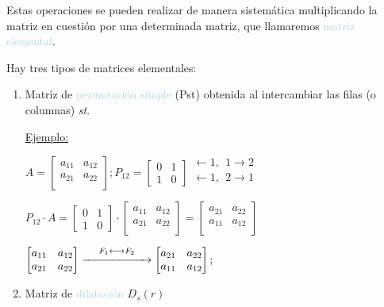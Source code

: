 \documentclass[12pt]{article}
\begin{document}
Estas operaciones se pueden realizar de manera sistemática
multiplicando la matriz en cuestión por una determinada matriz,
que llamaremos \textcolor{lightblue}{matriz elemental}.

Hay tres tipos de matrices elementales:

\begin{enumerate}
\item Matriz de \textcolor{lightblue}{permutación simple} (Pst)
obtenida al intercambiar las filas (o columnas) \emph{st}.
    
    \underline{Ejemplo:}

    $A=\begin{bmatrix}
        a_{11} & a_{12}\\
        a_{21} & a_{22}\\
    \end{bmatrix}; P_{12}=\begin{bmatrix}
        0 & 1\\ 
        1 & 0
    \end{bmatrix}\begin{array}{l}
        \longleftarrow 1,~~1\longrightarrow 2\\
        \longleftarrow 1,~~2\longrightarrow 1\\
    \end{array}$

    $P_{12}\cdot A=\begin{bmatrix}
        0 & 1\\
        1 & 0
    \end{bmatrix}\cdot    \begin{bmatrix}
        a_{11} & a_{12}\\
        a_{21} & a_{22}\\
    \end{bmatrix}=    \begin{bmatrix}
        a_{21} & a_{22}\\
        a_{11} & a_{12}\\
    \end{bmatrix}$

    $    \begin{bmatrix}
        a_{11} & a_{12}\\
        a_{21} & a_{22}\\
\end{bmatrix}\overset{F_1\longleftrightarrow
F_2}{\xrightarrow{\hspace*{2cm}}} \begin{bmatrix}
        a_{21} & a_{22}\\
        a_{11} & a_{12}\\
    \end{bmatrix};$
    \item Matriz de \textcolor{lightblue}{dilatación} $D_s(r)$
    

\end{enumerate}
\end{document}
